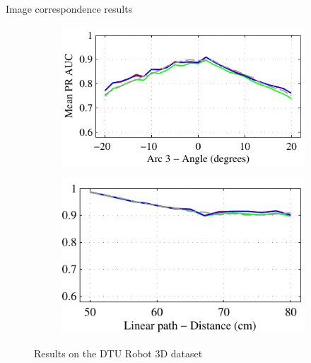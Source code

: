 \documentclass[14pt,t]{beamer}
\begin{document}
\begin{frame}{Image correspondence results}
\begin{figure}
\begin{subfigure}[t]{0.447\textwidth}
	\end{subfigure}
	\begin{subfigure}[t]{0.49\textwidth}
		\includegraphics[width=\textwidth]{img/dtuResultsPR_opponent_3.pdf}
	\end{subfigure}
	\begin{subfigure}[t]{0.44\textwidth}
		\includegraphics[width=\textwidth]{img/dtuResultsPR_opponent_4.pdf}
	\end{subfigure}
	\caption{Results on the DTU Robot 3D dataset}
\end{figure}
\end{frame}
%
\end{document}
